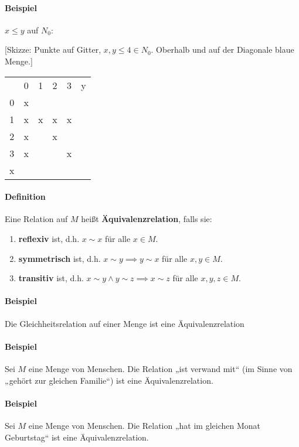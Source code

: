 \documentclass[14pt,a4paper]{article}
\begin{document}
			\paragraph{Beispiel} $ x \leq y $ auf $ N_0$:
				
				[Skizze: Punkte auf Gitter, $x,y \leq 4 \in N_0$. Oberhalb und auf der Diagonale blaue Menge.]

				\begin{tabular}{ c | c | c | c | c   c }
					  & 0 & 1 & 2 & 3 & y \\
					0 & x &   &   &   &   \\
					1 & x & x & x & x &   \\
					2 & x &   & x &   &   \\
					3 & x &   &   & x &   \\
					x &   &   &   &   &   \\
				\end{tabular}
			\paragraph{Definition}
				Eine Relation auf $M$ heißt \textbf{Äquivalenzrelation}, falls sie:
				\begin{enumerate}
					\item \textbf{reflexiv} ist, d.h. $ x \sim x $ für alle $ x \in M$.
					\item \textbf{symmetrisch} ist, d.h. $x \sim y \implies y \sim x $ für alle $ x,y \in M $.
					\item \textbf{transitiv} ist, d.h. $ x \sim y \land y \sim z \implies x \sim z$ für alle $x,y,z \in M$.
				\end{enumerate}
			\paragraph{Beispiel}
				Die Gleichheitsrelation auf einer Menge ist eine Äquivalenzrelation
			\paragraph{Beispiel}
				Sei $M$ eine Menge von Menschen. Die Relation „ist verwand mit“ (im Sinne von „gehört zur gleichen Familie“) ist eine Äquivalenzrelation.
			\paragraph{Beispiel}
				Sei $M$ eine Menge von Menschen. Die Relation „hat im gleichen Monat Geburtstag“ ist eine Äquivalenzrelation.
\end{document}
